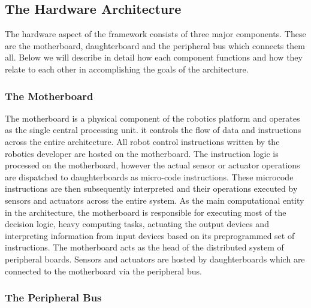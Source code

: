 \subsection{The Hardware Architecture} %
\label{sub:the_hardware_architecture}
The hardware aspect of the \xten framework consists of three major components. These are the motherboard, daughterboard and the peripheral bus which connects them all. Below we will describe in detail how each component functions and how they relate to each other in accomplishing the goals of the architecture.



	\subsubsection{The Motherboard} %
	\label{ssub:the_motherboard}
	The motherboard is a physical component of the robotics platform and operates as the single central processing unit. it controls the flow of data and instructions across the entire \xten architecture. All robot control instructions written by the robotics developer are hosted on the motherboard. The instruction logic is processed on the motherboard, however the actual sensor or actuator operations are dispatched to daughterboards as micro-code instructions. These microcode instructions are then subsequently interpreted and their operations executed by sensors and actuators across the entire system. As the main computational entity in the \xten architecture, the motherboard is responsible for executing most of the decision logic, heavy computing tasks, actuating the output devices and interpreting information from input devices based on its preprogrammed set of instructions.
The motherboard acts as the head of the distributed system of peripheral boards. Sensors and actuators are hosted by daughterboards which are connected to the motherboard via the peripheral bus. 
 
	
	\subsubsection{The Peripheral Bus} %
	\label{ssub:the_peripheral_bus}
	
